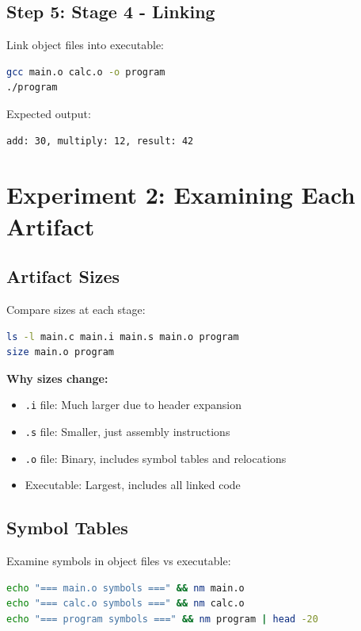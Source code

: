 \subsection{Step 5: Stage 4 - Linking}

Link object files into executable:

\begin{lstlisting}[language=bash]
gcc main.o calc.o -o program
./program
\end{lstlisting}

Expected output:

\begin{lstlisting}
add: 30, multiply: 12, result: 42
\end{lstlisting}

\section{Experiment 2: Examining Each Artifact}

\subsection{Artifact Sizes}

Compare sizes at each stage:

\begin{lstlisting}[language=bash]
ls -l main.c main.i main.s main.o program
size main.o program
\end{lstlisting}

\textbf{Why sizes change:}
\begin{itemize}
\item \texttt{.i} file: Much larger due to header expansion
\item \texttt{.s} file: Smaller, just assembly instructions
\item \texttt{.o} file: Binary, includes symbol tables and relocations
\item Executable: Largest, includes all linked code
\end{itemize}

\subsection{Symbol Tables}

Examine symbols in object files vs executable:

\begin{lstlisting}[language=bash]
echo "=== main.o symbols ===" && nm main.o
echo "=== calc.o symbols ===" && nm calc.o
echo "=== program symbols ===" && nm program | head -20
\end{lstlisting}

